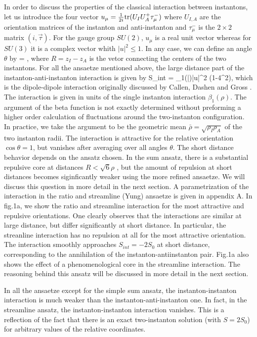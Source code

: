    In order to discuss the properties of the classical interaction
between instantons, let us introduce the four vector $u_\mu =
\frac{1}{2i}{\rm tr}(U_I U_A^+ \tau_\mu^{-})$ where $U_{I,A}$ are
the orientation matrices of the instanton and anti-instanton and
$\tau_\mu^-$ is the $2\times 2$ matrix $(i,\vec\tau)$. For the gauge
group $SU(2)$, $u_\mu$ is a real unit vector whereas for $SU(3)$
it is a complex vector whith $|u|^2\leq 1$. In any case, we can define
an angle $\theta$ by
\be
   \cos\theta = ,
\ee
where $R=z_I-z_A$ is the vetor connecting the centers of the two
instantons.  For all the ansaetze mentioned above, the large distance
part of the instanton-anti-instanton interaction is given by
\be
\label{dipole}
  S_{int} = \beta_1(\bar\rho)|u|^2
                  (1-4\cos^2\theta),
\ee
which is the dipole-dipole interaction originally discussed by Callen,
Dashen and Gross \cite{CDG_78}. The interaction is given in units of
the single instanton interaction $\beta_1(\rho)$. The argument of the
beta function is not exactly determined without preforming a higher
order calculation of fluctuations around the two-instanton configuration.
In practice, we take the argument to be the geometric mean $\bar\rho=
\sqrt{\rho_I\rho_A}$ of the two instanton radii. The interaction is
attractive for the relative orientation $\cos\theta=1$, but vanishes after
averaging over all angles $\theta$. The short distance behavior depends
on the ansatz chosen. In the sum ansatz, there is a substantial
repulsive core at distances $R<\sqrt{6}\rho$ \cite{DP_84}, but the
amount of repulsion at short distances becomes siginficantly weaker
using the more refined ansaetze. We will discuss this question in more
detail in the next section. A parametrization of the interaction in
the ratio and streamline (Yung) ansaetze is given in appendix A. In
fig.1a, we show the ratio and streamline interaction for the most
attractive and repulsive orientations. One clearly observes that the
interactions are similar at large distance, but differ significantly at
short distance. In particular, the streanline interaction has no
repulsion at all for the most attractive orientation. The interaction
smoothly approaches $S_{int}=-2S_0$ at short distance, corresponding
to the annihilation of the instanton-antiinstanton pair. Fig.1a also
shows the effect of a phenomenological core in the streamline interaction.
The reasoning behind this ansatz will be discussed in more detail in
the next section.

   In all the ansaetze except for the simple sum ansatz, the
instanton-instanton interaction is much weaker than the
instanton-anti-instanton one. In fact, in the streamline ansatz, the
instanton-instanton interaction vanishes. This is a reflection
of the fact that there is an exact two-instanton solution (with $S=2S_0$)
for arbitrary values of the relative coordinates.


